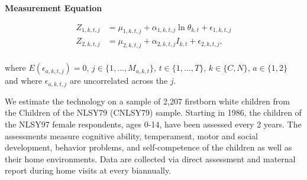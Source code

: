 \begin{frame}\textbf{Measurement Equation}\vspace{0.3cm}

\begin{align*}
Z_{1, k, t, j} & = \mu_{1, k, t, j} + \alpha_{1, k, t, j}\ln\theta_{k, t} + \epsilon_{1, k, t, j} \\
Z_{2, k, t, j} & = \mu_{2, k, t, j} + \alpha_{2, k, t, j}I_{k, t} + \epsilon_{2, k, t, j}, \\
\end{align*}

where $E(\epsilon_{a, k, t, j}) = 0$, $j \in\{1,\hdots, M_{a, k, t}\}$, $t\in\{1, \hdots, T\}$, $k \in\{C, N\}$, $a\in\{1, 2\}$ and where $\epsilon_{a, k, t, j}$ are uncorrelated across the $j$.

\end{frame}
\begin{frame} 
	\small{We estimate the technology on a sample of 2,207 firstborn white children from the Children of the NLSY79 (CNLSY79) sample. Starting in 1986, the children of the NLSY97 female respondents, ages 0-14, have been assessed every 2 years. The assessments measure cognitive ability, temperament, motor and social development, behavior problems, and self-competence of the children as well as their home environments. Data are collected via direct assessment and maternal report during home visits at every biannually.}
\end{frame}
